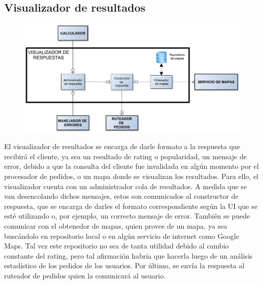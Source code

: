 \subsection{Visualizador de resultados}

\begin{figure}[H]
\centering
\includegraphics[width=\textwidth]{graph/visualizador.pdf}
\end{figure}

El visualizador de resultados se encarga de darle formato a la respuesta que recibirá el cliente, ya sea un resultado de rating o popularidad, un mensaje de error, debido a que la consulta del cliente fue invalidada en algún momento por el procesador de pedidos, o un mapa donde se visualizan los resultados. Para ello, el visualizador cuenta con un administrador cola de resultados. A medida que se van desencolando dichos mensajes, estos son comunicados al constructor de respuesta, que se encarga de darles el formato correspondiente según la UI que se esté utilizando o, por ejemplo, un correcto mensaje de error. También se puede comunicar con el obtenedor de mapas, quien provee de un mapa, ya sea buscándolo en repositorio local o en algún servicio de internet como Google Maps. Tal vez este repositorio no sea de tanta utilidad debido al cambio constante del rating, pero tal afirmación habría que hacerla luego de un análisis estadístico de los pedidos de los usuarios. Por último, se envía la respuesta al 
ruteador de pedidos quien la comunicará al usuario.
